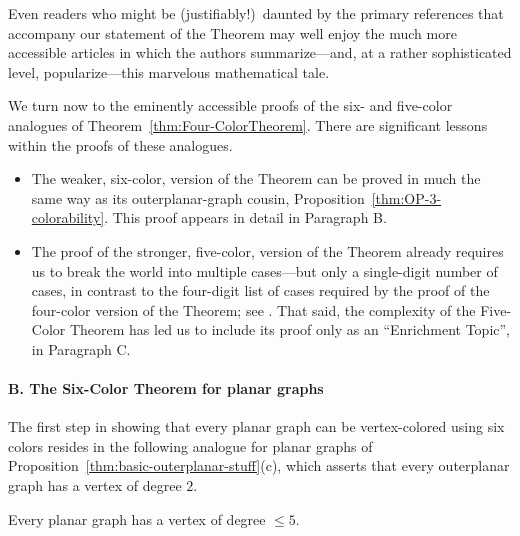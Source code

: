 \smallskip

Even readers who might be (justifiably!)~daunted by the primary references \cite{AppelH77a,AppelH77b} that accompany our statement of the Theorem may well enjoy the much more accessible articles \cite{AppelH77c,AppelH89} in which the authors summarize---and, at a rather sophisticated level, popularize---this marvelous mathematical tale.

\bigskip

We turn now to the eminently accessible proofs of the six- and five-color analogues of Theorem~\ref{thm:Four-ColorTheorem}.  There are significant lessons within the proofs of these 
analogues.
\begin{itemize}
\item
The weaker, six-color, version of the Theorem can be proved in much the same way as its
outerplanar-graph cousin, Proposition~\ref{thm:OP-3-colorability}.  This proof appears in detail in Paragraph B.  
\medskip\item
The proof of the stronger, five-color, version of the Theorem already requires us to break the world into multiple cases---but only a single-digit number of cases, in contrast to the four-digit list of cases required by the proof of the four-color version of the Theorem; see \cite{AppelH77a,AppelH77b}.  That said, the complexity of the Five-Color Theorem has led us to include its proof only as an ``Enrichment Topic'', in Paragraph C.
\end{itemize}


\paragraph {B. The Six-Color Theorem for planar graphs}

The first step in showing that every planar graph can be vertex-colored using six colors resides in the following analogue for planar graphs of Proposition~\ref{thm:basic-outerplanar-stuff}(c), which asserts that every outerplanar graph has a vertex of degree $2$.

\begin{lemma}
\label{thm:PlanarGraph-degree5}
Every planar graph has a vertex of degree $\leq 5$.
\end{lemma}

  

